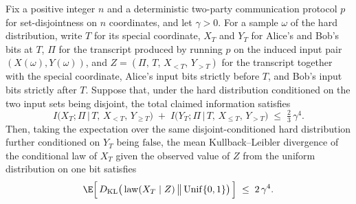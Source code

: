 \begin{theorem}
\label{CommunicationComplexity.Functions.Disjointness.RandomizedLowerBound.integral_xFiberKL_disjointSpecialYFalse_le_two_mul_gamma_pow_four}
\leanok
{}
Fix a positive integer $n$ and a deterministic two-party communication protocol $p$ for
set-disjointness on $n$ coordinates, and let $\gamma > 0$. For a sample $\omega$ of the
hard distribution, write $T$ for its special coordinate, $X_T$ and $Y_T$ for Alice's and
Bob's bits at $T$, $\Pi$ for the transcript produced by running $p$ on the induced input
pair $(X(\omega), Y(\omega))$, and $Z = (\Pi,\, T,\, X_{<T},\, Y_{>T})$ for the
transcript together with the special coordinate, Alice's input bits strictly before $T$,
and Bob's input bits strictly after $T$. Suppose that, under the hard distribution
conditioned on the two input sets being disjoint, the total claimed information
satisfies
\[
I\big(X_T ; \Pi \,\big|\, T,\, X_{<T},\, Y_{\ge T}\big) \;+\; I\big(Y_T ; \Pi \,\big|\,
T,\, X_{\le T},\, Y_{>T}\big) \;\le\; \tfrac{2}{3}\,\gamma^4 .
\]
Then, taking the expectation over the same disjoint-conditioned hard distribution
further conditioned on $Y_T$ being $\mathrm{false}$, the mean Kullback–Leibler
divergence of the conditional law of $X_T$ given the observed value of $Z$ from the
uniform distribution on one bit satisfies
\[
\E\Big[\, D_{\mathrm{KL}}\big(\operatorname{law}(X_T \mid Z) \,\big\|\,
\mathrm{Unif}\{0,1\}\big) \,\Big] \;\le\; 2\,\gamma^4 .
\]
\end{theorem}

